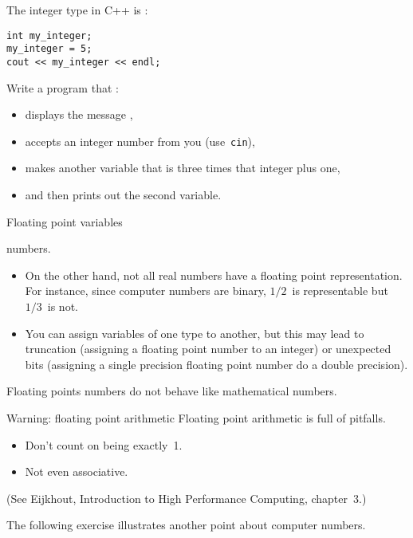 The integer type in C++ is :
\begin{lstlisting}
int my_integer;
my_integer = 5;
cout << my_integer << endl;
\end{lstlisting}

\begin{exercise}
  \label{ex:cin-cout3np1}
  Write a program that :
  \begin{itemize}
  \item displays the message ,
  \item accepts an integer number from you (use~\lstinline{cin}),
  \item makes another variable that is three times that integer plus one,
  \item and then prints out the second variable.
  \end{itemize}
\end{exercise}

 {Floating point variables}

 numbers.
\begin{itemize}
\item On the other hand, not all real numbers have a floating point
  representation. For instance, since computer numbers are binary,
  $1/2$~is representable but $1/3$~is not.
\item You can assign variables of one type to another, but this may
  lead to truncation (assigning a floating point number to an integer)
  or unexpected bits (assigning a single precision floating point
  number do a double precision).
\end{itemize}

Floating points numbers do not behave like mathematical numbers. 

\begin{block}{Warning: floating point arithmetic}
  \label{sl:float-arith}
  Floating point arithmetic is full of pitfalls.
  \begin{itemize}
  \item Don't count on  being exactly~1.
  \item Not even associative.
  \end{itemize}
  (See Eijkhout, Introduction to High Performance Computing, chapter~3.)
\end{block}

The following exercise illustrates another point about computer numbers.


